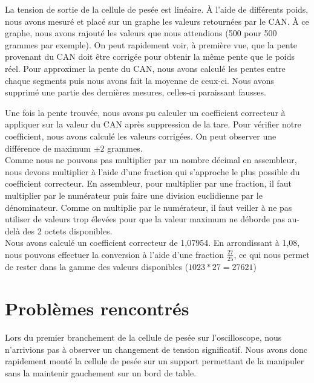\documentclass[a4paper,11pt,titlepage]{article}
\begin{document}
La tension de sortie de la cellule de pesée est linéaire. À l'aide de différents poids, nous avons mesuré et placé sur un graphe les valeurs retournées par le CAN. À ce graphe, nous avons rajouté les valeurs que nous attendions (500 pour 500 grammes par exemple). On peut rapidement voir, à première vue, que la pente provenant du CAN doit être corrigée pour obtenir la même pente que le poids réel. Pour approximer la pente du CAN, nous avons calculé les pentes entre chaque segments puis nous avons fait la moyenne de ceux-ci. Nous avons supprimé une partie des dernières mesures, celles-ci paraissant fausses.\\


Une fois la pente trouvée, nous avons pu calculer un coefficient correcteur à appliquer sur la valeur du CAN après suppression de la tare. Pour vérifier notre coefficient, nous avons calculé les valeurs corrigées. On peut observer une différence de maximum $\pm{2}$ grammes.\\

Comme nous ne pouvons pas multiplier par un nombre décimal en assembleur, nous devons multiplier à l'aide d'une fraction qui s'approche le plus possible du coefficient correcteur. En assembleur, pour multiplier par une fraction, il faut multiplier par le numérateur puis faire une division euclidienne par le dénominateur. Comme on multiplie par le numérateur, il faut veiller à ne pas utiliser de valeurs trop élevées pour que la valeur maximum ne déborde pas au-delà des 2 octets disponibles.\\

Nous avons calculé un coefficient correcteur de 1,07954. En arrondissant à 1,08, nous pouvons effectuer la conversion à l'aide d'une fraction $\frac{27}{25}$, ce qui nous permet de rester dans la gamme des valeurs disponibles ($1023 * 27 = 27621$)\\

\section{Problèmes rencontrés}

Lors du premier branchement de la cellule de pesée sur l'oscilloscope, nous n'arrivions pas à observer un changement de tension significatif. Nous avons donc rapidement monté la cellule de pesée sur un support permettant de la manipuler sans la maintenir gauchement sur un bord de table.\\
\end{document}
